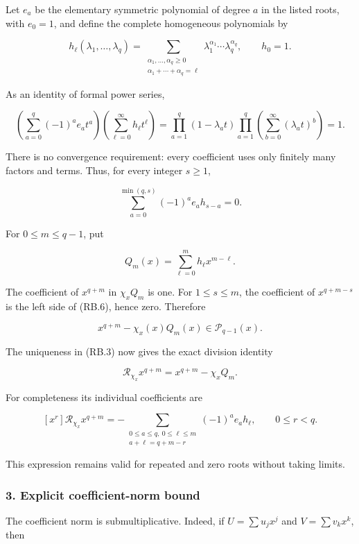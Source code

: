 Let \(e_a\) be the elementary symmetric polynomial of degree \(a\) in the listed roots, with \(e_0=1\), and define the complete homogeneous polynomials by

\[
h_\ell(\lambda_1,\ldots,\lambda_q)
=\sum_{\substack{\alpha_1,\ldots,\alpha_q\geq0\\
                  \alpha_1+\cdots+\alpha_q=\ell}}
\lambda_1^{\alpha_1}\cdots\lambda_q^{\alpha_q},
\qquad h_0=1.
\tag{RB.4}
\]

As an identity of formal power series,

\[
\left(\sum_{a=0}^{q}(-1)^ae_at^a\right)
\left(\sum_{\ell=0}^{\infty}h_\ell t^\ell\right)
=\prod_{a=1}^{q}(1-\lambda_at)
 \prod_{a=1}^{q}\left(\sum_{b=0}^{\infty}(\lambda_at)^b\right)=1.
\tag{RB.5}
\]

There is no convergence requirement: every coefficient uses only finitely many factors and terms. Thus, for every integer \(s\geq1\),

\[
\sum_{a=0}^{\min(q,s)}(-1)^ae_ah_{s-a}=0.
\tag{RB.6}
\]

For \(0\leq m\leq q-1\), put

\[
Q_m(x)=\sum_{\ell=0}^{m}h_\ell x^{m-\ell}.
\tag{RB.7}
\]

The coefficient of \(x^{q+m}\) in \(\chi_xQ_m\) is one. For \(1\leq s\leq m\), the coefficient of \(x^{q+m-s}\) is the left side of (RB.6), hence zero. Therefore

\[
x^{q+m}-\chi_x(x)Q_m(x)\in\mathcal P_{q-1}(x).
\]

The uniqueness in (RB.3) now gives the exact division identity

\[
\boxed{\mathcal R_{\chi_x}x^{q+m}=x^{q+m}-\chi_xQ_m.}
\tag{RB.8}
\]

For completeness its individual coefficients are

\[
[x^r]\mathcal R_{\chi_x}x^{q+m}
=-\sum_{\substack{0\leq a\leq q,\ 0\leq\ell\leq m\\
                   a+\ell=q+m-r}}
(-1)^ae_ah_\ell,
\qquad 0\leq r<q.
\tag{RB.9}
\]

This expression remains valid for repeated and zero roots without taking limits.

\subsubsection{3. Explicit coefficient-norm bound}\label{endpoint-relation_balance_original--explicit-coefficient-norm-bound}

The coefficient norm is submultiplicative. Indeed, if \(U=\sum u_jx^j\) and \(V=\sum v_kx^k\), then

